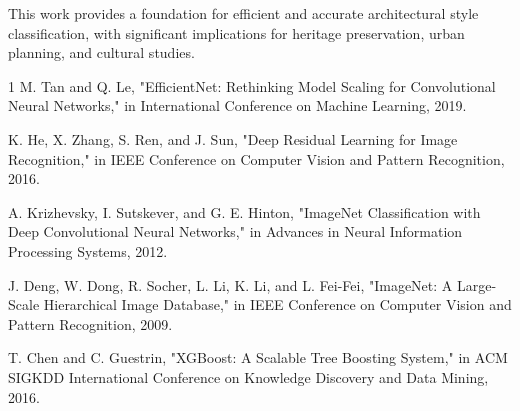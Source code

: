 \documentclass[conference]{IEEEtran}
\begin{document}
This work provides a foundation for efficient and accurate architectural style classification, with significant implications for heritage preservation, urban planning, and cultural studies.

\begin{thebibliography}{1}
M. Tan and Q. Le, "EfficientNet: Rethinking Model Scaling for Convolutional Neural Networks," in International Conference on Machine Learning, 2019.

K. He, X. Zhang, S. Ren, and J. Sun, "Deep Residual Learning for Image Recognition," in IEEE Conference on Computer Vision and Pattern Recognition, 2016.

A. Krizhevsky, I. Sutskever, and G. E. Hinton, "ImageNet Classification with Deep Convolutional Neural Networks," in Advances in Neural Information Processing Systems, 2012.

J. Deng, W. Dong, R. Socher, L. Li, K. Li, and L. Fei-Fei, "ImageNet: A Large-Scale Hierarchical Image Database," in IEEE Conference on Computer Vision and Pattern Recognition, 2009.

T. Chen and C. Guestrin, "XGBoost: A Scalable Tree Boosting System," in ACM SIGKDD International Conference on Knowledge Discovery and Data Mining, 2016.
\end{thebibliography}
\end{document}
